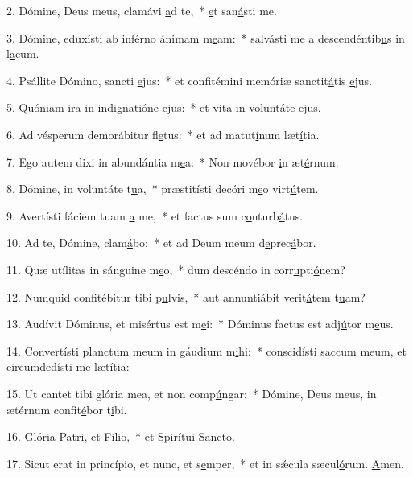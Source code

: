 2. Dómine, Deus meus, clamávi \uline{a}d te,~* \uline{e}t san\uline{á}sti me.\par 
3. Dómine, eduxísti ab inférno ánimam m\uline{e}am:~* salvásti me a descendéntib\uline{u}s in l\uline{a}cum.\par 
4. Psállite Dómino, sancti \uline{e}jus:~* et confitémini memóriæ sanctit\uline{á}tis \uline{e}jus.\par 
5. Quóniam ira in indignatióne \uline{e}jus:~* et vita in volunt\uline{á}te \uline{e}jus.\par 
6. Ad vésperum demorábitur fl\uline{e}tus:~* et ad matut\uline{í}num læt\uline{í}tia.\par 
7. Ego autem dixi in abundántia m\uline{e}a:~* Non movébor \uline{i}n æt\uline{é}rnum.\par 
8. Dómine, in voluntáte t\uline{u}a,~* præstitísti decóri m\uline{e}o virt\uline{ú}tem.\par 
9. Avertísti fáciem tuam \uline{a} me,~* et factus sum c\uline{o}nturb\uline{á}tus.\par 
10. Ad te, Dómine, clam\uline{á}bo:~* et ad Deum meum d\uline{e}prec\uline{á}bor.\par 
11. Quæ utílitas in sánguine m\uline{e}o,~* dum descéndo in corr\uline{u}pti\uline{ó}nem?\par 
12. Numquid confitébitur tibi p\uline{u}lvis,~* aut annuntiábit verit\uline{á}tem t\uline{u}am?\par 
13. Audívit Dóminus, et misértus est m\uline{e}i:~* Dóminus factus est adj\uline{ú}tor m\uline{e}us.\par 
14. Convertísti planctum meum in gáudium m\uline{i}hi:~* conscidísti saccum meum, et circumdedísti m\uline{e} læt\uline{í}tia:\par 
15. Ut cantet tibi glória mea, et non comp\uline{ú}ngar:~* Dómine, Deus meus, in ætérnum confit\uline{é}bor t\uline{i}bi.\par 
16. Glória Patri, et F\uline{í}lio,~* et Spir\uline{í}tui S\uline{a}ncto.\par 
17. Sicut erat in princípio, et nunc, et s\uline{e}mper,~* et in sǽcula sæcul\uline{ó}rum. \uline{A}men.\par 
